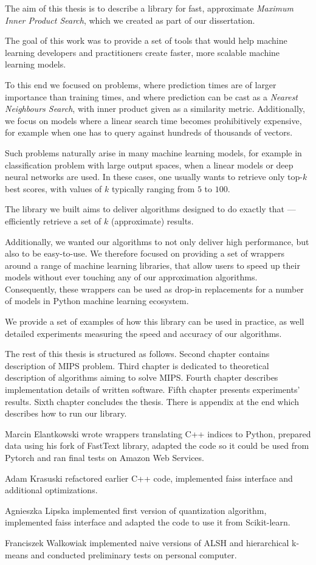 The aim of this thesis is to describe a library for fast, approximate \textit{Maximum Inner Product Search},
which we created as part of our dissertation. 

The goal of this work was to provide a set of tools that would help machine learning developers and practitioners create faster, 
more scalable machine learning models.

To this end we focused on problems, where prediction times are of larger importance than training times, and where prediction can be 
cast as a \textit{Nearest Neighbours Search}, with inner product given as a similarity metric. Additionally, we focus
on models where a linear search time becomes prohibitively expensive, for example when one has to query against hundreds of thousands of vectors.

Such problems naturally arise in many machine learning models, for example in classification problem with large output spaces, 
when a linear models or deep neural networks are used. In these cases, one usually wants to retrieve only top-$k$ best scores, with values
of $k$ typically ranging from $5$ to $100$.

The library we built aims to deliver algorithms designed to do exactly that --- efficiently retrieve a set of $k$ (approximate) results.

Additionally, we wanted our algorithms to not only deliver high performance, but also to be easy-to-use. We therefore 
focused on providing a set of wrappers around a range of machine learning libraries, that allow users to 
speed up their models without ever touching any of our approximation algorithms. Consequently, these wrappers can be used as drop-in replacements for a number of models in Python machine learning ecosystem.

We provide a set of examples of how this library can be used in practice, as well detailed experiments measuring the speed and 
accuracy of our algorithms.

The rest of this thesis is structured as follows.
Second chapter contains description of MIPS problem.
Third chapter is dedicated to theoretical description of algorithms aiming to solve MIPS.
Fourth chapter describes implementation details of written software.
Fifth chapter presents experiments' results.
Sixth chapter concludes the thesis.
There is appendix at the end which describes how to run our library.

Marcin Elantkowski wrote wrappers translating C++ indices to Python, prepared data using his fork of FastText library, adapted the code so it could be used from Pytorch and ran final tests on Amazon Web Services.

Adam Krasuski refactored earlier C++ code, implemented faiss interface and additional optimizations.

Agnieszka Lipska implemented first version of quantization algorithm, implemented faiss interface and adapted the code to use it from Scikit-learn.

Franciszek Walkowiak implemented naive versions of ALSH and hierarchical \mbox{k-means} and conducted preliminary tests on personal computer.

